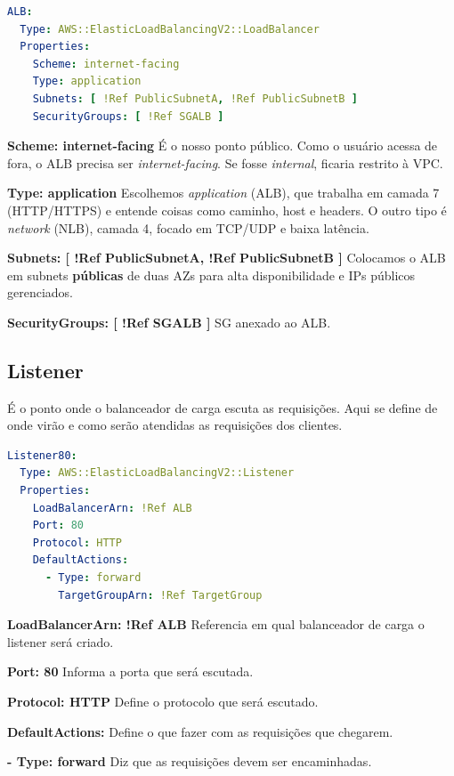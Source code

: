 \begin{lstlisting}[language=YAML]
ALB:
  Type: AWS::ElasticLoadBalancingV2::LoadBalancer
  Properties:
    Scheme: internet-facing
    Type: application
    Subnets: [ !Ref PublicSubnetA, !Ref PublicSubnetB ]
    SecurityGroups: [ !Ref SGALB ]
\end{lstlisting}

\textbf{Scheme: internet-facing} É o nosso ponto público. Como o usuário acessa de fora, o ALB precisa ser \textit{internet-facing}. Se fosse \textit{internal}, ficaria restrito à VPC.

\textbf{Type: application} Escolhemos \textit{application} (ALB), que trabalha em camada 7 (HTTP/HTTPS) e entende coisas como caminho, host e headers. O outro tipo é \textit{network} (NLB), camada 4, focado em TCP/UDP e baixa latência.

\textbf{Subnets: [ !Ref PublicSubnetA, !Ref PublicSubnetB ]} Colocamos o ALB em subnets \textbf{públicas} de duas AZs para alta disponibilidade e IPs públicos gerenciados.

\textbf{SecurityGroups: [ !Ref SGALB ]} SG anexado ao ALB.

\subsection{Listener}
É o ponto onde o balanceador de carga escuta as requisições. Aqui se define de onde virão e como serão atendidas as requisições dos clientes.\\

\begin{lstlisting}[language=YAML]
Listener80:
  Type: AWS::ElasticLoadBalancingV2::Listener
  Properties:
    LoadBalancerArn: !Ref ALB
    Port: 80
    Protocol: HTTP
    DefaultActions:
      - Type: forward
        TargetGroupArn: !Ref TargetGroup
\end{lstlisting}

\textbf{LoadBalancerArn: !Ref ALB} Referencia em qual balanceador de carga o listener será criado.

\textbf{Port: 80} Informa a porta que será escutada.

\textbf{Protocol: HTTP} Define o protocolo que será escutado.

\textbf{DefaultActions:} Define o que fazer com as requisições que chegarem.

\textbf{- Type: forward} Diz que as requisições devem ser encaminhadas.

